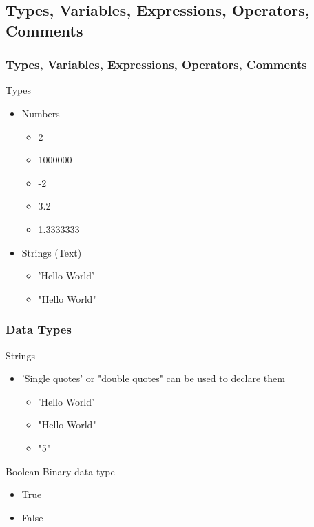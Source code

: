 \documentclass[10pt, a4paper]{beamer} %
\begin{document}
\subsection{Types, Variables, Expressions, Operators, Comments} %
\label{sub:Types_variables_expressions_operators_comments}

\begin{frame}[c]\frametitle{Types, Variables, Expressions, Operators, Comments}
\begin{block}{Types}
    \begin{itemize}
        \item Numbers
        \begin{itemize}
            \item 2
            \item 1000000
            \item -2
            \item 3.2
            \item 1.3333333
        \end{itemize}
        \item Strings (Text)
        \begin{itemize}
            \item {\color{blue}'Hello World'}
            \item {\color{red}"Hello World"}
        \end{itemize}
    \end{itemize}
\end{block}
    
\end{frame}

\begin{frame}[c]\frametitle{Data Types}
    \begin{block}{Strings}
    \begin{itemize}
        \item {\color{blue} 'Single quotes'} or {\color{red} "double quotes"} can be used to declare them
        \begin{itemize}
            \item 'Hello World'
            \item "Hello World"
            \item "5"
        \end{itemize}
    \end{itemize}
    \end{block}
    \begin{block}{Boolean}
    Binary data type
        \begin{itemize}
            \item True
            \item False
        \end{itemize}
    \end{block}

\end{frame}
\end{document}
